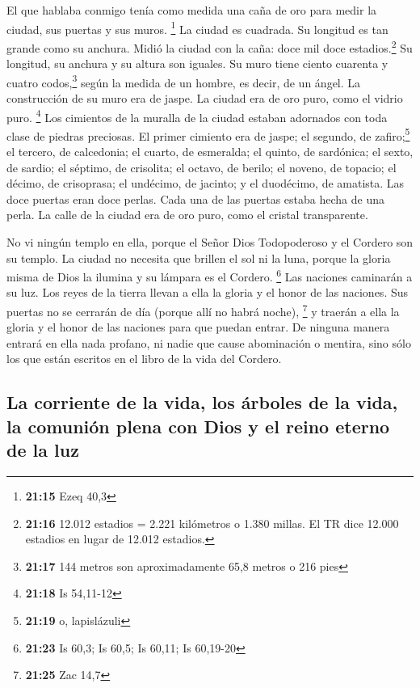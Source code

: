  El que hablaba conmigo tenía como medida una caña de oro
para medir la ciudad, sus puertas y sus muros. \footnote{\textbf{21:15}
  Ezeq 40,3}  La ciudad es cuadrada. Su longitud es tan
grande como su anchura. Midió la ciudad con la caña: doce mil doce
estadios.\footnote{\textbf{21:16} 12.012 estadios = 2.221 kilómetros o
  1.380 millas. El TR dice 12.000 estadios en lugar de 12.012 estadios.}
Su longitud, su anchura y su altura son iguales.  Su muro
tiene ciento cuarenta y cuatro codos,\footnote{\textbf{21:17} 144 metros
  son aproximadamente 65,8 metros o 216 pies} según la medida de un
hombre, es decir, de un ángel.  La construcción de su
muro era de jaspe. La ciudad era de oro puro, como el vidrio puro.
\footnote{\textbf{21:18} Is 54,11-12}  Los cimientos de
la muralla de la ciudad estaban adornados con toda clase de piedras
preciosas. El primer cimiento era de jaspe; el segundo, de
zafiro;\footnote{\textbf{21:19} o, lapislázuli} el tercero, de
calcedonia; el cuarto, de esmeralda;  el quinto, de
sardónica; el sexto, de sardio; el séptimo, de crisolita; el octavo, de
berilo; el noveno, de topacio; el décimo, de crisoprasa; el undécimo, de
jacinto; y el duodécimo, de amatista.  Las doce puertas
eran doce perlas. Cada una de las puertas estaba hecha de una perla. La
calle de la ciudad era de oro puro, como el cristal transparente.

 No vi ningún templo en ella, porque el Señor Dios
Todopoderoso y el Cordero son su templo.  La ciudad no
necesita que brillen el sol ni la luna, porque la gloria misma de Dios
la ilumina y su lámpara es el Cordero. \footnote{\textbf{21:23} Is 60,3;
  Is 60,5; Is 60,11; Is 60,19-20}  Las naciones caminarán
a su luz. Los reyes de la tierra llevan a ella la gloria y el honor de
las naciones.  Sus puertas no se cerrarán de día (porque
allí no habrá noche), \footnote{\textbf{21:25} Zac 14,7} 
y traerán a ella la gloria y el honor de las naciones para que puedan
entrar.  De ninguna manera entrará en ella nada profano,
ni nadie que cause abominación o mentira, sino sólo los que están
escritos en el libro de la vida del Cordero.

\hypertarget{la-corriente-de-la-vida-los-uxe1rboles-de-la-vida-la-comuniuxf3n-plena-con-dios-y-el-reino-eterno-de-la-luz}{%
\subsection{La corriente de la vida, los árboles de la vida, la comunión
plena con Dios y el reino eterno de la
luz}\label{la-corriente-de-la-vida-los-uxe1rboles-de-la-vida-la-comuniuxf3n-plena-con-dios-y-el-reino-eterno-de-la-luz}}

